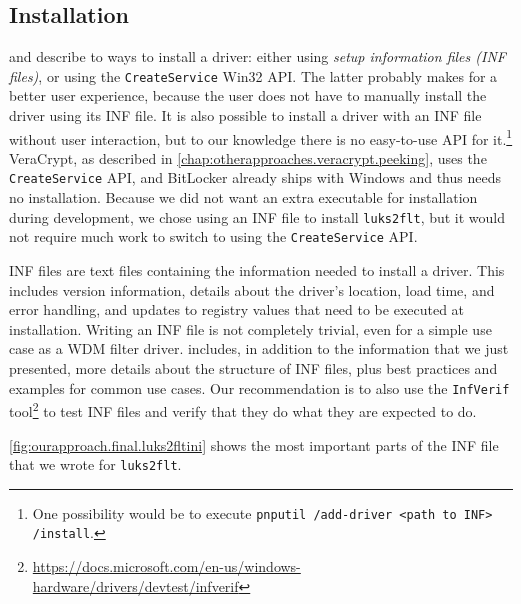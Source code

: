 \subsection{Installation}
\label{chap:ourapproach.final.install}
\cite{Yosifovich2017} and \cite{Wdk} describe to ways to install a driver: either using \emph{setup information files (INF files)}, or using the \texttt{CreateService} Win32 API. The latter probably makes for a better user experience, because the user does not have to manually install the driver using its INF file. It is also possible to install a driver with an INF file without user interaction, but to our knowledge there is no easy-to-use API for it.\footnote{\label{fn:ourapproach.final.automaticinfinstall} One possibility would be to execute \texttt{pnputil /add-driver <path to INF> /install}.} VeraCrypt, as described in \autoref{chap:otherapproaches.veracrypt.peeking}, uses the \texttt{CreateService} API, and BitLocker already ships with Windows and thus needs no installation. Because we did not want an extra executable for installation during development, we chose using an INF file to install \texttt{luks2flt}, but it would not require much work to switch to using the \texttt{CreateService} API.

INF files are text files containing the information needed to install a driver. This includes version information, details about the driver's location, load time, and error handling, and updates to registry values that need to be executed at installation. Writing an INF file is not completely trivial, even for a simple use case as a WDM filter driver. \cite{Wdk} includes, in addition to the information that we just presented, more details about the structure of INF files, plus best practices and examples for common use cases. Our recommendation is to also use the \texttt{InfVerif} tool\footnote{\label{fn:ourapproach.final.infverif} \url{https://docs.microsoft.com/en-us/windows-hardware/drivers/devtest/infverif}} to test INF files and verify that they do what they are expected to do.

\autoref{fig:ourapproach.final.luks2fltini} shows the most important parts of the INF file that we wrote for \texttt{luks2flt}.

